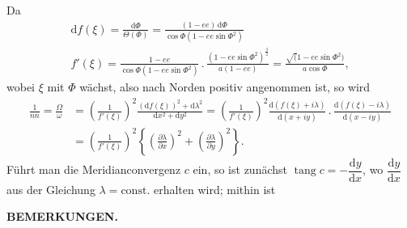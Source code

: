 {Da
\[
\begin{gathered}
\mathrm df(\xi)=\frac{\mathrm d\Phi}{\Theta(\Phi)}
=\frac{(1-ee)\,\mathrm d\Phi}{\cos\Phi(1-ee\sin\Phi^2)}\\
f'(\xi)=\frac{1-ee}{\cos\Phi(1-ee\sin\Phi^2)}
\,.\,\frac{(1-ee\sin\Phi^2)^{\frac32}}{a(1-ee)}
=\frac{\surd(1-ee\sin\Phi^2)}{a\cos\Phi},
\end{gathered}
\]
\noindent wobei \(\xi\) mit \(\Phi\) wächst, also nach Norden positiv angenommen ist, so wird
\[
\begin{aligned}
\frac1{nn}=\frac{\Omega}{\omega}
 &=\left(\frac1{f'(\xi)}\right)^2
 \frac{(\mathrm df(\xi))^2+\mathrm d\lambda^2}{\mathrm dx^2+\mathrm dy^2}
 =\left(\frac1{f'(\xi)}\right)^2
 \frac{\mathrm d(f(\xi)+i\lambda)}{\mathrm d(x+iy)}
 \,.\,\frac{\mathrm d(f(\xi)-i\lambda)}{\mathrm d(x-iy)}\\
 &=\left(\frac1{f'(\xi)}\right)^2
 \left\{\left(\frac{\partial\lambda}{\partial x}\right)^2+
 \left(\frac{\partial\lambda}{\partial y}\right)^2\right\}.
\end{aligned}
\]
Führt man die Meridianconvergenz \(c\) ein, so ist zunächst
\(\operatorname{tang}c=-\dfrac{\mathrm dy}{\mathrm dx}\), wo
\(\dfrac{\mathrm dy}{\mathrm dx}\) aus der Gleichung
\(\lambda=\mathrm{const.}\) erhalten wird; mithin ist
\par}

\par\clearpage
\noindent{}\hfill{\small\textbf{BEMERKUNGEN.}}\hfill\null\par\medskip

